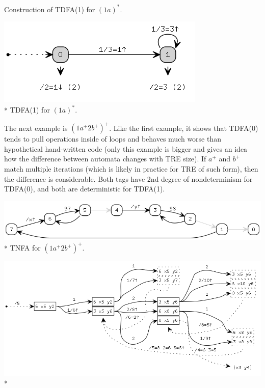\documentclass{article}
\theoremstyle{definition}
\begin{document}
\begin{multicols}{2}
\begin{center}
\footnotesize{Construction of TDFA(1) for $(1 a)^*$.} \\
\end{center}
\begin{center}
\includegraphics[width=0.6\linewidth]{img/example6/tdfa1.png}\\*
\footnotesize{TDFA(1) for $(1 a)^*$.} \\
\end{center}

The next example is $(1 a^+ 2 b^+)^+$.
Like the first example, it shows that TDFA(0) tends to pull operations inside of loops
and behaves much worse than hypothetical hand-written code
(only this example is bigger and gives an idea how the difference between automata changes with TRE size).
If $a^+$ and $b^+$ match multiple iterations (which is likely in practice for TRE of such form), then the difference is considerable.
Both tags have 2nd degree of nondeterminism for TDFA(0), and both are deterministic for TDFA(1).
\begin{center}
\includegraphics[width=\linewidth]{img/example5/tnfa.png}\\*
\footnotesize{TNFA for $(1 a^+ 2 b^+)^+$.} \\
\end{center}
\begin{center}
\includegraphics[width=\linewidth]{img/example5/tdfa0_raw.png}\\*

\end{center}
\end{multicols}
\end{document}
